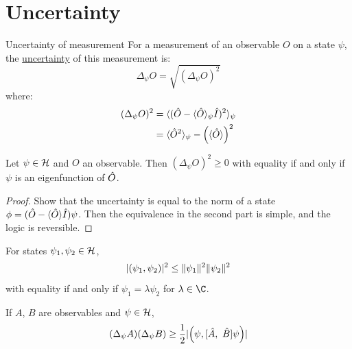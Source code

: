 \documentclass[../Main.tex]{subfiles}
\begin{document}
\section{Uncertainty}
\begin{definition}{Uncertainty of measurement}
    For a measurement of an observable $O$ on a state $\psi$, the \underline{uncertainty} of this measurement is:
    \begin{equation*}
        \Delta_\psi O = \sqrt{(\Delta_\psi O)^2}
    \end{equation*}
    where:
    \begin{align*}
        (\Delta_\psi O)^2 &= \langle (\hat{O} - \langle \hat{O} \rangle_\psi \hat{I})^2 \rangle_\psi \\
        &= \langle \hat{O}^2 \rangle_\psi - \left(\langle \hat{O} \rangle\right)^2
    \end{align*}
\end{definition}
\begin{lemma}
    Let $\psi \in \mathcal{H}$ and $O$ an observable. Then $(\Delta_\psi O)^2 \geq 0$ with equality if and only if $\psi$ is an eigenfunction of $\hat{O}$.
    \label{lemNoUncIffEFunc}
\end{lemma}
\begin{proof}
    Show that the uncertainty is equal to the norm of a state $\phi = (\hat{O} - \langle \hat{O} \rangle\hat{I})\psi$. Then the equivalence in the second part is simple, and the logic is reversible.
\end{proof}
\begin{lemma}
    For states $\psi_1, \psi_2 \in \mathcal{H}$,
    \begin{equation*}
        \lvert\left(\psi_1,\psi_2\right)\rvert^2 \leq \lVert\psi_1\rVert^2 \lVert\psi_2\rVert^2
    \end{equation*}
    with equality if and only if $\psi_1 = \lambda \psi_2$ for $\lambda \in \C$.
    \label{lemCauchySchwarz}
\end{lemma}
\begin{theorem}
    If $A$, $B$ are observables and $\psi \in \mathcal{H}$,
    \begin{equation}
        (\Delta_\psi A)(\Delta_\psi B) \geq \frac12 \lvert\left(\psi,[\hat{A},~\hat{B}]\psi\right)\rvert
        \label{eqnGeneralisedUncertainty}
    \end{equation}
    \label{thmGeneralisedUncertainty}
\end{theorem}
\end{document}
